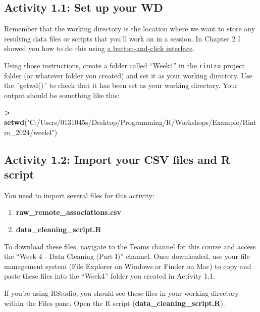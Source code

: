 \documentclass[
]{book}
\newenvironment{Shaded}{\begin{snugshade}}{\end{snugshade}}
\newcommand{\FunctionTok}[1]{\textcolor[rgb]{0.13,0.29,0.53}{\textbf{#1}}}
\newcommand{\NormalTok}[1]{#1}
\newcommand{\SpecialCharTok}[1]{\textcolor[rgb]{0.81,0.36,0.00}{\textbf{#1}}}
\newcommand{\StringTok}[1]{\textcolor[rgb]{0.31,0.60,0.02}{#1}}
\begin{document}
\subsection{Activity 1.1: Set up your WD}\label{activity-1.1-set-up-your-wd}

Remember that the working directory is the location where we want to store any resulting data files or scripts that you'll work on in a session. In Chapter 2 I showed you how to do this using \hyperref[set_wd]{a button-and-click interface}.

Using those instructions, create a folder called ``Week4'' in the \texttt{rintro} project folder (or whatever folder you created) and set it as your working directory. Use the ´getwd()´ to check that it has been set as your working directory. Your output should be something like this:

\begin{Shaded}
\begin{Highlighting}[]
\SpecialCharTok{\textgreater{}} \FunctionTok{setwd}\NormalTok{(}\StringTok{"C:/Users/0131045s/Desktop/Programming/R/Workshops/Example/Rintro\_2024/week4"}\NormalTok{)}
\end{Highlighting}
\end{Shaded}

\subsection{Activity 1.2: Import your CSV files and R script}\label{activity-1.2-import-your-csv-files-and-r-script}

You need to import several files for this activity:

\begin{enumerate}
\def\labelenumi{\arabic{enumi}.}
\item
  \textbf{raw\_remote\_associations.csv}
\item
  \textbf{data\_cleaning\_script.R}
\end{enumerate}

To download these files, navigate to the Teams channel for this course and access the ``Week 4 - Data Cleaning (Part I)'' channel. Once downloaded, use your file management system (File Explorer on Windows or Finder on Mac) to copy and paste these files into the ``Week4'' folder you created in Activity 1.1.

If you're using RStudio, you should see these files in your working directory within the Files pane. Open the R script (\textbf{data\_cleaning\_script.R}).
\end{document}
